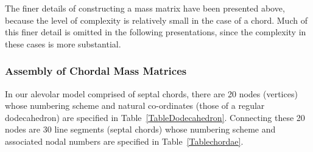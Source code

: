 The finer details of constructing a mass matrix have been presented above, because the level of complexity is relatively small in the case of a chord.  Much of this finer detail is omitted in the following presentations, since the complexity in these cases is more substantial.

\subsubsection{Assembly of Chordal Mass Matrices}

In our alevolar model comprised of septal chords, there are 20 nodes (vertices) whose numbering scheme and natural co-ordinates (those of a regular dodecahedron) are specified in Table~\ref{TableDodecahedron}.  Connecting these 20 nodes are 30 line segments (septal chords) whose numbering scheme and associated nodal numbers are specified in Table~\ref{Tablechordae}.


